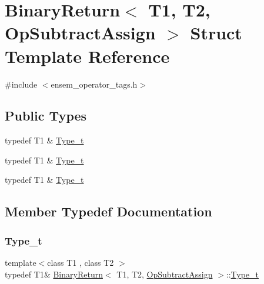 \hypertarget{structBinaryReturn_3_01T1_00_01T2_00_01OpSubtractAssign_01_4}{}\section{Binary\+Return$<$ T1, T2, Op\+Subtract\+Assign $>$ Struct Template Reference}
\label{structBinaryReturn_3_01T1_00_01T2_00_01OpSubtractAssign_01_4}


{\ttfamily \#include $<$ensem\+\_\+operator\+\_\+tags.\+h$>$}

\subsection*{Public Types}
\begin{DoxyCompactItemize}
\item 
typedef T1 \& \mbox{\hyperlink{structBinaryReturn_3_01T1_00_01T2_00_01OpSubtractAssign_01_4_a93357e4d56f953a4f58fec3320ba9db3}{Type\+\_\+t}}
\item 
typedef T1 \& \mbox{\hyperlink{structBinaryReturn_3_01T1_00_01T2_00_01OpSubtractAssign_01_4_a93357e4d56f953a4f58fec3320ba9db3}{Type\+\_\+t}}
\item 
typedef T1 \& \mbox{\hyperlink{structBinaryReturn_3_01T1_00_01T2_00_01OpSubtractAssign_01_4_a93357e4d56f953a4f58fec3320ba9db3}{Type\+\_\+t}}
\end{DoxyCompactItemize}


\subsection{Member Typedef Documentation}
\mbox{\label{structBinaryReturn_3_01T1_00_01T2_00_01OpSubtractAssign_01_4_a93357e4d56f953a4f58fec3320ba9db3}} 
\subsubsection{\texorpdfstring{Type\_t}{Type\_t}\hspace{0.1cm}{\footnotesize\ttfamily [1/3]}}
{\footnotesize\ttfamily template$<$class T1 , class T2 $>$ \\
typedef T1\& \mbox{\hyperlink{structBinaryReturn}{Binary\+Return}}$<$ T1, T2, \mbox{\hyperlink{structOpSubtractAssign}{Op\+Subtract\+Assign}} $>$\+::\mbox{\hyperlink{structBinaryReturn_3_01T1_00_01T2_00_01OpSubtractAssign_01_4_a93357e4d56f953a4f58fec3320ba9db3}{Type\+\_\+t}}}

